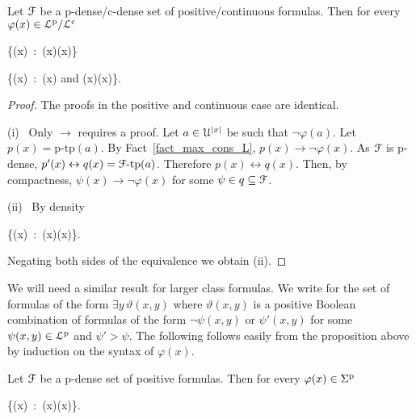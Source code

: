 \documentclass[10pt,oneside]{amsproc}
\renewcommand*{\emph}[1]{%
   \smash{\tikz[baseline]\node[rectangle, fill=teal!25, rounded corners, inner xsep=0.5ex, inner ysep=0.2ex, anchor=base, minimum height = 2.7ex]{\strut #1};}}
\begin{document}
{\begin{proposition}\label{prop_Fapprox}
  Let ${\EuScript F}$ be a p-dense/c-dense set of positive/continuous formulas.
  Then for every $\varphi(x)\in{\EuScript L}^{\rm p}/{\EuScript L}^{\rm c}$
  
  {\leftrightarrow}
  {\bigvee\big\{\psi(x)\ :\ \psi(x)\rightarrow\neg\varphi(x)\big\}}

  {\leftrightarrow}
  {\bigvee\big\{\neg\psi(x)\ :\ \psi(x)\textrm{ and }\neg\psi(x)\rightarrow\neg\varphi(x)\big\}.}

\end{proposition}
 
\begin{proof}
  The proofs in the positive and continuous case are identical.
  
  (i) \ Only $\rightarrow$ requires a proof.
  Let $a\in {\EuScript U}^{|x|}$ be such that $\neg\varphi(a)$.
  Let $p(x)=\mbox{p-tp}(a)$.
  By Fact~\ref{fact_max_cons_L}, $p(x)\rightarrow\neg\varphi(x)$.
  As ${\EuScript F}$ is p-dense, $p'(x)\leftrightarrow q(x)={\EuScript F}\mbox{-tp}(a)$.
  Therefore $p(x)\leftrightarrow q(x)$.
  Then, by compactness, $\psi(x)\rightarrow\neg\varphi(x)$ for some $\psi\in q\subseteq{\EuScript F}$.

  (ii) \ By density

  {\leftrightarrow}
  {\bigwedge\big\{\psi(x)\ :\ \varphi(x)\rightarrow\psi(x)\big\}.}
  
  Negating both sides of the equivalence we obtain (ii).
\end{proof}

We will need a similar result for larger class formulas.
We write \emph{$\Sigma^{\rm p}$\/} for the set of formulas of the form $\exists y\,\vartheta(x,y)$ where $\vartheta(x,y)$ is a positive Boolean combination of formulas of the form $\neg\psi(x,y)$ or $\psi'(x,y)$ for some $\psi(x,y)\in{\EuScript L}^{\rm p}$ and $\psi'>\psi$.
The following follows easily from the proposition above by induction on the syntax of $\varphi(x)$.

\begin{proposition}\label{prop_Sigma_approx}
  Let ${\EuScript F}$ be a p-dense set of positive formulas.
  Then for every $\varphi(x)\in\Sigma^{\rm p}$
  
  {\leftrightarrow}
  {\bigvee\big\{\psi(x)\ :\ \psi(x)\rightarrow\varphi(x)\big\}.}
\end{proposition}


}
\end{document}
